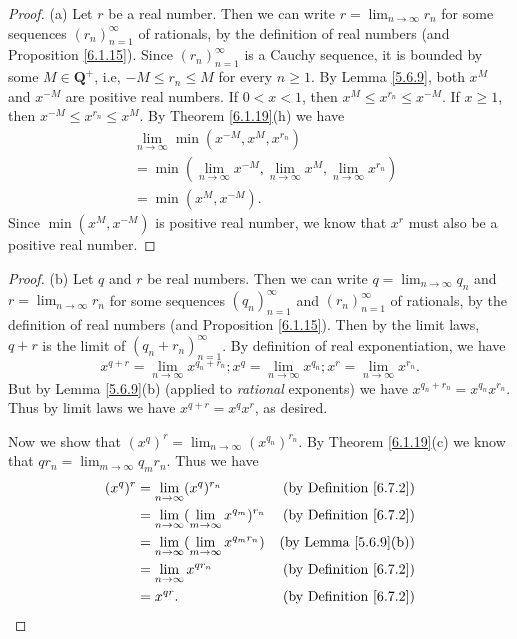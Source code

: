 \begin{proof}{(a)}
    Let \(r\) be a real number.
    Then we can write \(r = \lim_{n \to \infty} r_n\) for some sequences \((r_n)_{n = 1}^\infty\) of rationals, by the definition of real numbers (and Proposition \ref{6.1.15}).
    Since \((r_n)_{n = 1}^\infty\) is a Cauchy sequence, it is bounded by some \(M \in \mathbf{Q}^+\), i.e, \(-M \leq r_n \leq M\) for every \(n \geq 1\).
    By Lemma \ref{5.6.9}, both \(x^M\) and \(x^{-M}\) are positive real numbers.
    If \(0 < x < 1\), then \(x^M \leq x^{r_n} \leq x^{-M}\).
    If \(x \geq 1\), then \(x^{-M} \leq x^{r_n} \leq x^M\).
    By Theorem \ref{6.1.19}(h) we have
    \begin{align*}
         & \lim_{n \to \infty} \min(x^{-M}, x^M, x^{r_n})                                           \\
         & = \min(\lim_{n \to \infty} x^{-M}, \lim_{n \to \infty} x^M, \lim_{n \to \infty} x^{r_n}) \\
         & = \min(x^M, x^{-M}).
    \end{align*}
    Since \(\min(x^M, x^{-M})\) is positive real number, we know that \(x^r\) must also be a positive real number.
\end{proof}

\begin{proof}{(b)}
    Let \(q\) and \(r\) be real numbers.
    Then we can write \(q = \lim_{n \to \infty} q_n\) and \(r = \lim_{n \to \infty} r_n\) for some sequences \((q_n)_{n = 1}^\infty\) and \((r_n)_{n = 1}^\infty\) of rationals, by the definition of real numbers (and Proposition \ref{6.1.15}).
    Then by the limit laws, \(q + r\) is the limit of \((q_n + r_n)_{n = 1}^\infty\).
    By definition of real exponentiation, we have
    \[
        x^{q + r} = \lim_{n \to \infty} x^{q_n + r_n} ; x^q = \lim_{n \to \infty} x^{q_n} ;  x^r = \lim_{n \to \infty} x^{r_n}.
    \]
    But by Lemma \ref{5.6.9}(b) (applied to \emph{rational} exponents) we have \(x^{q_n + r_n} = x^{q_n} x^{r_n}\).
    Thus by limit laws we have \(x^{q + r} = x^q x^r\), as desired.

    Now we show that \((x^q)^r = \lim_{n \to \infty} (x^{q_n})^{r_n}\).
    By Theorem \ref{6.1.19}(c) we know that \(q r_n = \lim_{m \to \infty} q_m r_n\).
    Thus we have
    \begin{align*}
        (x^q)^r & = \lim_{n \to \infty} (x^q)^{r_n}                         & \text{(by Definition \ref{6.7.2})} \\
                & = \lim_{n \to \infty} (\lim_{m \to \infty} x^{q_m})^{r_n} & \text{(by Definition \ref{6.7.2})} \\
                & = \lim_{n \to \infty} (\lim_{m \to \infty} x^{q_m r_n})   & \text{(by Lemma \ref{5.6.9}(b))}   \\
                & = \lim_{n \to \infty} x^{q r_n}                           & \text{(by Definition \ref{6.7.2})} \\
                & = x^{qr}.                                                 & \text{(by Definition \ref{6.7.2})}
    \end{align*}
\end{proof}

